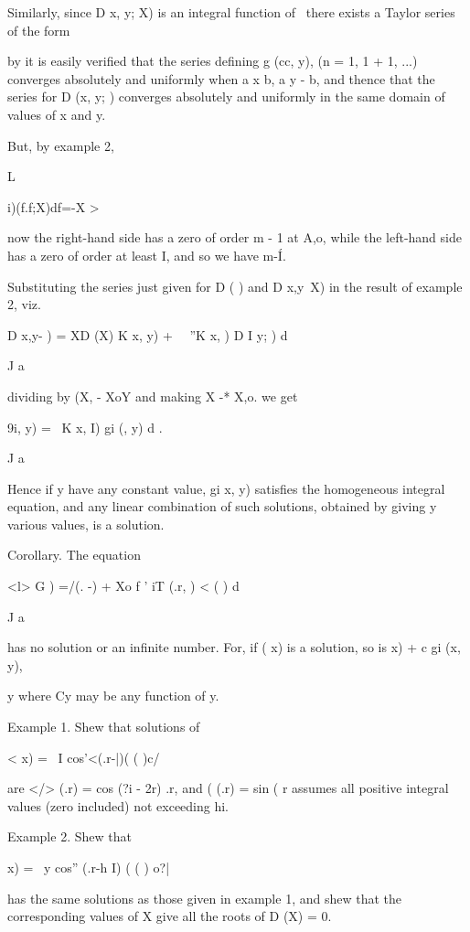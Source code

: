 %
%

Similarly, since D x, y; X) is an integral function of \, there
exists a Taylor series of the form

by it is easily verified that the series defining g (cc, y), (n
= 1, 1 + 1, ...) converges absolutely and uniformly when a x b, a y -
b, and thence that the series for D (x, y; ) converges absolutely and
uniformly in the same domain of values of x and y.

But, by example 2,

L

i)(f.f;X)df=-X >

now the right-hand side has a zero of order m - 1 at A,o, while the
left-hand side has a zero of order at least I, and so we have m-\' I.

Substituting the series just given for D ( ) and D x,y\ X) in the
result of example 2, viz.

D x,y- ) = XD (X) K x, y) + \ \ ''K x, ) D I y; ) d

J a

dividing by (X, - XoY and making X -* X,o. we get

9i, y) = \ K x, I) gi (, y) d .

J a

Hence if y have any constant value, gi x, y) satisfies the homogeneous
integral equation, and any linear combination of such solutions,
obtained by giving y various values, is a solution.

Corollary. The equation

<l> G ) =/(. -) + Xo f ' iT (.r, ) < ( ) d

J a

has no solution or an infinite number. For, if ( x) is a solution, so
is x) + c gi (x, y),

y where Cy may be any function of y.

Example 1. Shew that solutions of

< x) = \ I cos'<(.r-|)( ( )c/

are </> (.r) = cos (?i - 2r) .r, and ( (.r) = sin (%
r assumes all positive integral values (zero included) not exceeding
hi.

Example 2. Shew that

  x) = \ y cos'' (.r-h I) ( ( ) o?|

has the same solutions as those given in example 1, and shew that the
corresponding values of X give all the roots of D (X) = 0.

